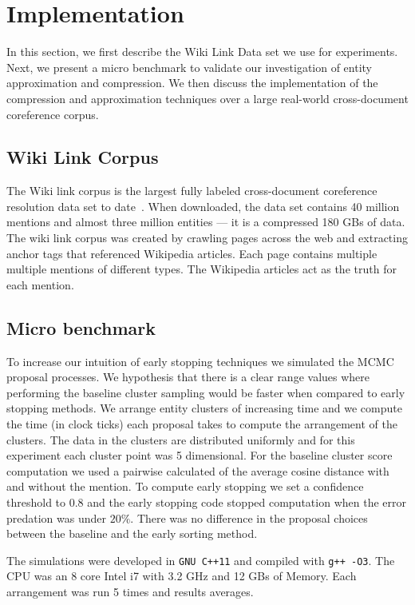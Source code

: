 
\section{Implementation}

In this section, we first describe the Wiki Link Data set we use for experiments.
Next, we present a micro benchmark to validate our investigation of entity approximation and compression.
We then discuss the implementation of the compression and approximation techniques over a large real-world
cross-document coreference corpus.

\subsection{Wiki Link Corpus}

The Wiki link corpus is the largest fully labeled cross-document coreference resolution data set to date~\cite{singh12:wiki-links}.
When downloaded, the data set contains 40 million mentions and almost three million entities --- it is a compressed 180 GBs of data.
The wiki link corpus was created by crawling pages across the web and extracting anchor tags that referenced Wikipedia articles.
Each page contains multiple multiple mentions of different types.
The Wikipedia articles act as the truth for each mention.


\subsection{Micro benchmark}
\label{sec:microbenchmark}
To increase our intuition of early stopping techniques we simulated the MCMC proposal processes. 
We hypothesis that there is a clear range values where performing the
baseline cluster sampling would be faster when compared to early stopping methods.
We arrange entity clusters of increasing time and we compute the time (in clock ticks)
each proposal takes to compute the arrangement of the clusters.
The data in the clusters are distributed uniformly and for this experiment each cluster point
was 5 dimensional.
For the baseline cluster score computation we used a pairwise calculated of the average cosine distance
with and without the mention.
To compute early stopping we set a confidence threshold to $0.8$ and the early
stopping code stopped computation when the error predation was under $20\%$.
There was no difference in the proposal choices between the baseline and the early sorting method. 

The simulations were developed in \texttt{GNU C++11} and compiled with \texttt{g++ -O3}. 
The CPU was an 8 core Intel i7 with 3.2 GHz and 12 GBs of Memory.
Each arrangement was run 5 times and results averages.



